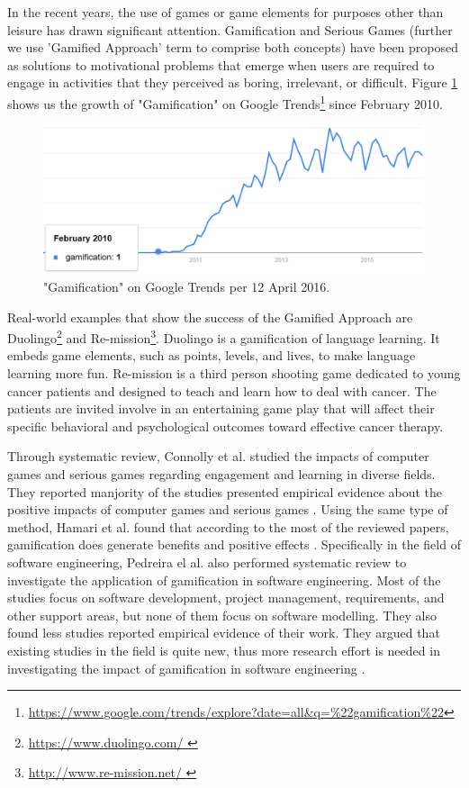 \documentclass[12pt, a4paper]{report}
\begin{document}
In the recent years, the use of games or game elements for purposes other than leisure has drawn significant attention.  Gamification \cite{deterding2011game} and Serious Games \cite{Michael2005} (further we use 'Gamified Approach' term to comprise both concepts) have been proposed as solutions to motivational problems that emerge when users are required to engage in activities that they perceived as boring, irrelevant, or difficult. Figure \ref{gamification-trend} shows us the growth of "Gamification" on Google Trends\footnote{\url{https://www.google.com/trends/explore?date=all&q=\%22gamification\%22}} since  February 2010.  

\begin{figure}[ht]
\centering
\includegraphics[width=12cm]{gamification-trend}
\caption{"Gamification" on Google Trends per 12 April 2016.}
\label{gamification-trend}
\end{figure}

Real-world examples that show the success of the Gamified Approach are Duolingo\footnote{\url{https://www.duolingo.com/
}} and Re-mission\footnote{\url{http://www.re-mission.net/
}}. Duolingo is a gamification of language learning. It embeds game elements, such as points, levels, and lives, to make language learning more fun. Re-mission is a third person shooting game dedicated to young cancer patients and designed to teach and learn how to deal with cancer. The patients are invited involve in an entertaining game play that will affect their specific behavioral and psychological outcomes toward effective cancer therapy.
      
Through systematic review, Connolly et al. studied the impacts of computer games and serious games regarding engagement and learning in diverse fields. They reported manjority of the studies presented empirical evidence about the positive impacts of computer games and serious games  \cite{connolly2012systematic}. Using the same type of method, Hamari et al. found that according to the most of the reviewed papers, gamification does generate benefits and positive effects \cite{hamari2014does}. Specifically in the field of software engineering, Pedreira el al. also performed  systematic review to investigate the application of gamification in software engineering.  Most of the studies  focus on software development, project management, requirements, and other support areas, but none of them focus on software modelling. They also found less studies reported empirical evidence of their work. They argued that existing studies in the field is quite new, thus more research effort is needed in investigating the impact of gamiﬁcation in software engineering \cite{Pedreira2015}. 
\end{document}
